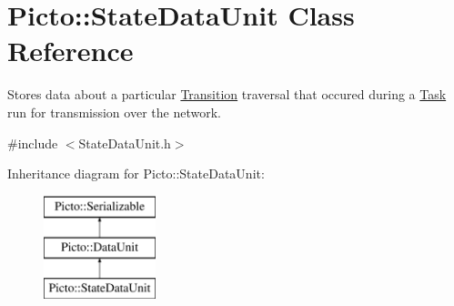 \hypertarget{class_picto_1_1_state_data_unit}{\section{Picto\-:\-:State\-Data\-Unit Class Reference}
\label{class_picto_1_1_state_data_unit}
}


Stores data about a particular \hyperlink{class_picto_1_1_transition}{Transition} traversal that occured during a \hyperlink{class_picto_1_1_task}{Task} run for transmission over the network.  




{\ttfamily \#include $<$State\-Data\-Unit.\-h$>$}

Inheritance diagram for Picto\-:\-:State\-Data\-Unit\-:\begin{figure}[H]
\begin{center}
\leavevmode
\includegraphics[height=3.000000cm]{class_picto_1_1_state_data_unit}
\end{center}
\end{figure}
